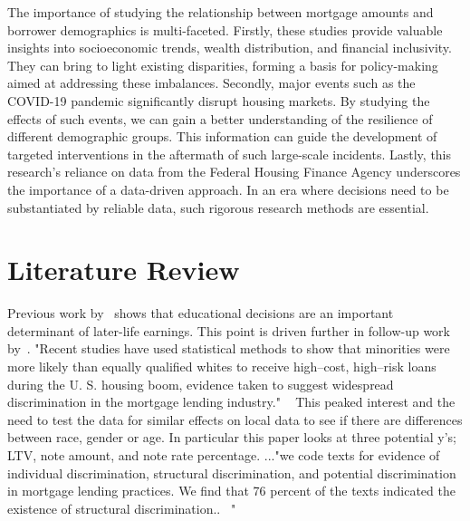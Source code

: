 \documentclass[12pt,english]{article}
\begin{document}
The importance of studying the relationship between mortgage amounts and borrower demographics is multi-faceted. Firstly, these studies provide valuable insights into socioeconomic trends, wealth distribution, and financial inclusivity. They can bring to light existing disparities, forming a basis for policy-making aimed at addressing these imbalances. Secondly, major events such as the COVID-19 pandemic significantly disrupt housing markets. By studying the effects of such events, we can gain a better understanding of the resilience of different demographic groups. This information can guide the development of targeted interventions in the aftermath of such large-scale incidents. Lastly, this research's reliance on data from the Federal Housing Finance Agency underscores the importance of a data-driven approach. In an era where decisions need to be substantiated by reliable data, such rigorous research methods are essential.



\section{Literature Review}\label{sec:litreview}
Previous work by~\cite{gupta2022financial} shows that educational decisions are an important determinant of later-life earnings. This point is driven further in follow-up work by~\cite{gupta2022financial}.
"Recent studies have used statistical methods to show that minorities were more likely than equally qualified whites to receive high–cost, high–risk loans during the U. S. housing boom, evidence taken to suggest widespread discrimination in the mortgage lending industry." ~\cite{Massey2016RidingTS} This peaked interest and the need to test the data for similar effects on local data to see if there are differences between race, gender or age. In particular this paper looks at three potential y's; LTV, note amount, and note rate percentage. 
..."we code texts for evidence of individual discrimination, structural discrimination, and potential discrimination in mortgage lending practices. We find that 76 percent of the texts indicated the existence of structural discrimination..~\cite{Massey2016RidingTS} "
\end{document}
